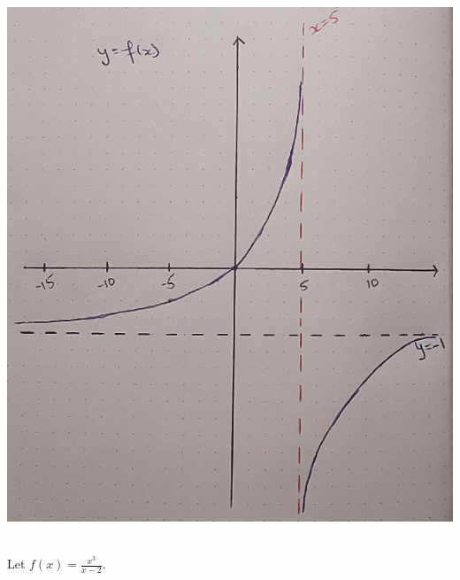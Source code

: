 \begin{enumerate}[label=\textbf{\Alph*.}]
\begin{center}
		\includegraphics[scale=0.5]{no10.png}
		\end{center}
	\end{enumerate}
	
	\phantom{2}
	
	\newpage
	
	\\
	Let $f(x) = \frac{x^3}{x - 2}$.
	
